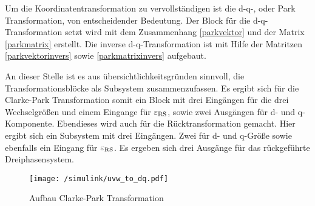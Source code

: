 

Um die Koordinatentransformation zu vervollständigen ist die d-q-, oder Park Transformation, von entscheidender Bedeutung.
Der Block für die d-q-Transformation setzt wird mit dem Zusammenhang \ref{parkvektor} und der Matrix \ref{parkmatrix} erstellt. 
Die inverse d-q-Transformation ist mit Hilfe der Matritzen \ref{parkvektorinvers} sowie \ref{parkmatrixinvers} aufgebaut.





An dieser Stelle ist es aus übersichtlichkeitsgründen sinnvoll, die Transformationsblöcke als Subsystem zusammenzufassen.
Es ergibt sich für die Clarke-Park Transformation somit ein Block mit drei Eingängen für die drei Wechselgrößen und einem Eingange für $\varepsilon_{\mathrm{RS}}$, sowie zwei Ausgängen für d- und q-Komponente.
Ebendieses wird auch für die Rücktransformation gemacht. 
Hier ergibt sich ein Subsystem mit drei Eingängen. 
Zwei für d- und q-Größe sowie ebenfalls ein Eingang für $\varepsilon_{\mathrm{RS}}$.
Es ergeben sich drei Ausgänge für das rückgeführte Dreiphasensystem.

\newpage
\begin{figure}[h]
	\centering
	\texttt{[image: /simulink/uvw\_to\_dq.pdf]}
	\label{fig:uvw_to_dq}
	\caption{Aufbau Clarke-Park Transformation}
\end{figure}

